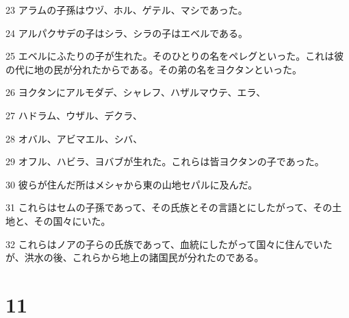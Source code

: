 \par 23 アラムの子孫はウヅ、ホル、ゲテル、マシであった。
\par 24 アルパクサデの子はシラ、シラの子はエベルである。
\par 25 エベルにふたりの子が生れた。そのひとりの名をペレグといった。これは彼の代に地の民が分れたからである。その弟の名をヨクタンといった。
\par 26 ヨクタンにアルモダデ、シャレフ、ハザルマウテ、エラ、
\par 27 ハドラム、ウザル、デクラ、
\par 28 オバル、アビマエル、シバ、
\par 29 オフル、ハビラ、ヨバブが生れた。これらは皆ヨクタンの子であった。
\par 30 彼らが住んだ所はメシャから東の山地セパルに及んだ。
\par 31 これらはセムの子孫であって、その氏族とその言語とにしたがって、その土地と、その国々にいた。
\par 32 これらはノアの子らの氏族であって、血統にしたがって国々に住んでいたが、洪水の後、これらから地上の諸国民が分れたのである。

\chapter{11}

